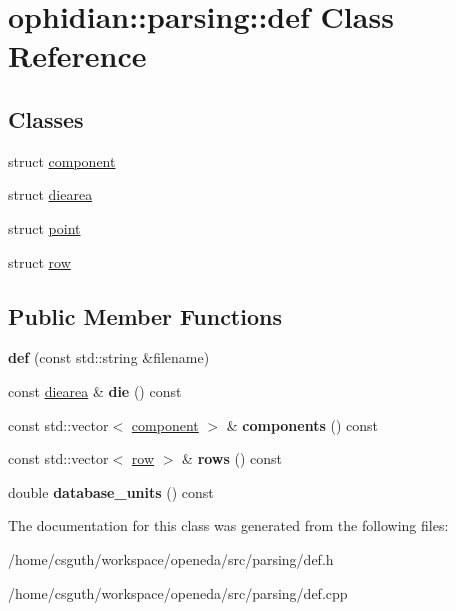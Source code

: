 \hypertarget{classophidian_1_1parsing_1_1def}{\section{ophidian\-:\-:parsing\-:\-:def Class Reference}
\label{classophidian_1_1parsing_1_1def}
}
\subsection*{Classes}
\begin{DoxyCompactItemize}
\item 
struct \hyperlink{structophidian_1_1parsing_1_1def_1_1component}{component}
\item 
struct \hyperlink{structophidian_1_1parsing_1_1def_1_1diearea}{diearea}
\item 
struct \hyperlink{structophidian_1_1parsing_1_1def_1_1point}{point}
\item 
struct \hyperlink{structophidian_1_1parsing_1_1def_1_1row}{row}
\end{DoxyCompactItemize}
\subsection*{Public Member Functions}
\begin{DoxyCompactItemize}
\item 
\hypertarget{classophidian_1_1parsing_1_1def_aee4f41b36a40953b69668487c6d506c5}{{\bfseries def} (const std\-::string \&filename)}\label{classophidian_1_1parsing_1_1def_aee4f41b36a40953b69668487c6d506c5}

\item 
\hypertarget{classophidian_1_1parsing_1_1def_ac20f28ac1eeccb805c2c3c407e071819}{const \hyperlink{structophidian_1_1parsing_1_1def_1_1diearea}{diearea} \& {\bfseries die} () const }\label{classophidian_1_1parsing_1_1def_ac20f28ac1eeccb805c2c3c407e071819}

\item 
\hypertarget{classophidian_1_1parsing_1_1def_a30c75518a9dd5070acae9beb74f2de9c}{const std\-::vector$<$ \hyperlink{structophidian_1_1parsing_1_1def_1_1component}{component} $>$ \& {\bfseries components} () const }\label{classophidian_1_1parsing_1_1def_a30c75518a9dd5070acae9beb74f2de9c}

\item 
\hypertarget{classophidian_1_1parsing_1_1def_aeb3e22c694289365795cac9327571805}{const std\-::vector$<$ \hyperlink{structophidian_1_1parsing_1_1def_1_1row}{row} $>$ \& {\bfseries rows} () const }\label{classophidian_1_1parsing_1_1def_aeb3e22c694289365795cac9327571805}

\item 
\hypertarget{classophidian_1_1parsing_1_1def_aa4adfe4ad4857b5bd30a03d272de80f5}{double {\bfseries database\-\_\-units} () const }\label{classophidian_1_1parsing_1_1def_aa4adfe4ad4857b5bd30a03d272de80f5}

\end{DoxyCompactItemize}


The documentation for this class was generated from the following files\-:\begin{DoxyCompactItemize}
\item 
/home/csguth/workspace/openeda/src/parsing/def.\-h\item 
/home/csguth/workspace/openeda/src/parsing/def.\-cpp\end{DoxyCompactItemize}
